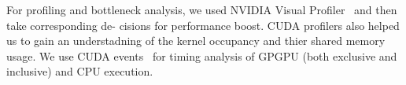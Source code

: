 For profiling and bottleneck analysis, we used
NVIDIA Visual Profiler~\cite{rosen2013visual} and then take corresponding de-
cisions for performance boost. CUDA profilers also helped us to gain an understadning 
of the kernel occupancy and thier shared memory usage.
We use CUDA events~\cite{wilt2013cuda} for timing analysis of GPGPU (both exclusive and inclusive) and
CPU execution.  


